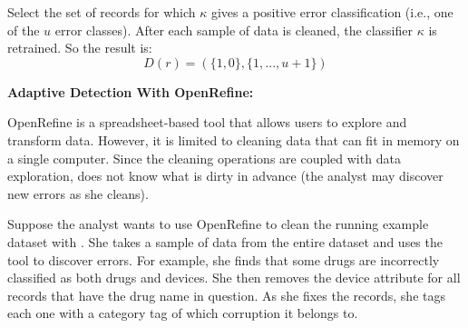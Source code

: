 
\begin{definition}
Select the set of records for which $\kappa$ gives a positive error classification (i.e., one of the $u$ error classes).
After each sample of data is cleaned, the classifier $\kappa$ is retrained.
So the result is:
\[D(r) = (\{1,0\},\{1,...,u+1\})\]
\end{definition}

\vspace{0.75em}

\noindent\textbf{Adaptive Detection With OpenRefine: }
\begin{example}\label{detex2}
OpenRefine is a spreadsheet-based tool that allows users to explore and transform data.
However, it is limited to cleaning data that can fit in memory on a single computer.
Since the cleaning operations are coupled with data exploration, \sys does not know what is dirty in advance (the analyst may discover new errors as she cleans).

Suppose the analyst wants to use OpenRefine to clean the running example dataset with \sys.
She takes a sample of data from the entire dataset and uses the tool to discover errors.
For example, she finds that some drugs are incorrectly classified as both drugs and devices.
She then removes the device attribute for all records that have the drug name in question.
As she fixes the records, she tags each one with a category tag of which corruption it belongs to.
\end{example}






